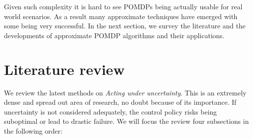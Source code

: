 Given such complexity it is hard to see POMDPs being actually usable for real world scenarios. As a result many approximate 
techniques have emerged with some being very successful. In the next section, we survey the literature 
and the developments of approximate POMDP algorithms and their applications.







\section{Literature review}\label{sec:lit_rev}

We review the latest methods on \textit{Acting under uncertainty}. This is an extremely dense and spread out area of research, 
no doubt because of its importance. If uncertainty is not considered adequately, the control policy risks being suboptimal or lead to drastic failure. 
We will focus the review four subsections in the following order: 


